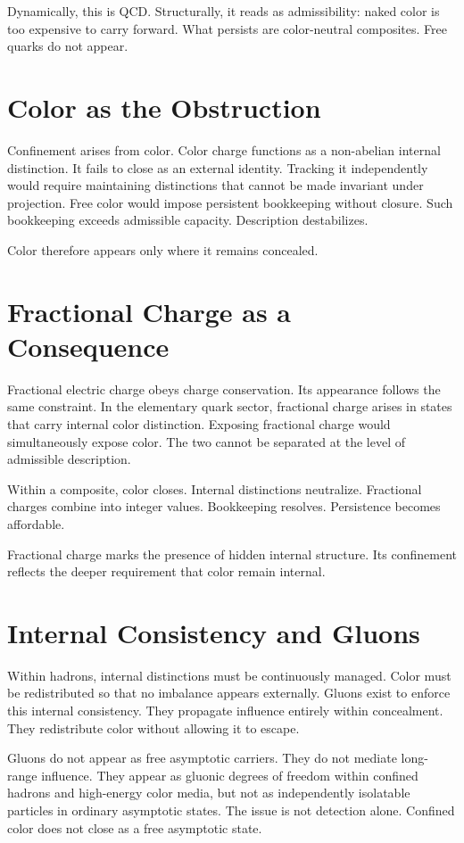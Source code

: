 \documentclass[11pt,twoside,openright]{book}
\begin{document}
Dynamically, this is QCD. Structurally, it reads as admissibility: naked color is too expensive to carry forward. What persists are color-neutral composites. Free quarks do not appear.

\section*{Color as the Obstruction}

Confinement arises from color. Color charge functions as a non-abelian internal distinction. It fails to close as an external identity. Tracking it independently would require maintaining distinctions that cannot be made invariant under projection. Free color would impose persistent bookkeeping without closure. Such bookkeeping exceeds admissible capacity. Description destabilizes.

Color therefore appears only where it remains concealed.

\section*{Fractional Charge as a Consequence}

Fractional electric charge obeys charge conservation. Its appearance follows the same constraint. In the elementary quark sector, fractional charge arises in states that carry internal color distinction. Exposing fractional charge would simultaneously expose color. The two cannot be separated at the level of admissible description.

Within a composite, color closes. Internal distinctions neutralize. Fractional charges combine into integer values. Bookkeeping resolves. Persistence becomes affordable.

Fractional charge marks the presence of hidden internal structure. Its confinement reflects the deeper requirement that color remain internal.

\section*{Internal Consistency and Gluons}

Within hadrons, internal distinctions must be continuously managed. Color must be redistributed so that no imbalance appears externally. Gluons exist to enforce this internal consistency. They propagate influence entirely within concealment. They redistribute color without allowing it to escape.

Gluons do not appear as free asymptotic carriers. They do not mediate long-range influence. They appear as gluonic degrees of freedom within confined hadrons and high-energy color media, but not as independently isolatable particles in ordinary asymptotic states. The issue is not detection alone. Confined color does not close as a free asymptotic state.
\end{document}

